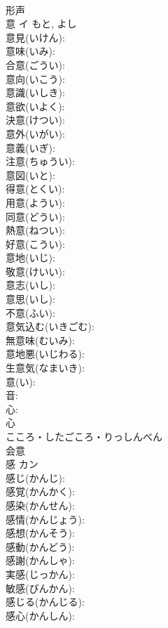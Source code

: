 \documentclass[8pt]{extreport}
\begin{document}
\begin{CJK}{UTF8}{min}
\\	形声 
\\	意	イ		もと, よし	
\\	意見(いけん): 
\\	意味(いみ): 
\\	合意(ごうい): 
\\	意向(いこう): 
\\	意識(いしき): 
\\	意欲(いよく): 
\\	決意(けつい): 
\\	意外(いがい): 
\\	意義(いぎ): 
\\	注意(ちゅうい): 
\\	意図(いと): 
\\	得意(とくい): 
\\	用意(ようい): 
\\	同意(どうい): 
\\	熱意(ねつい): 
\\	好意(こうい): 
\\	意地(いじ): 
\\	敬意(けいい): 
\\	意志(いし): 
\\	意思(いし): 
\\	不意(ふい): 
\\	意気込む(いきごむ): 
\\	無意味(むいみ): 
\\	意地悪(いじわる): 
\\	生意気(なまいき): 
\\	意(い): 
\\	音: 
\\	心: 
\\	心	
\\	こころ・したごころ・りっしんべん	
\\	会意 
\\	感	カン			
\\	感じ(かんじ): 
\\	感覚(かんかく): 
\\	感染(かんせん): 
\\	感情(かんじょう): 
\\	感想(かんそう): 
\\	感動(かんどう): 
\\	感謝(かんしゃ): 
\\	実感(じっかん): 
\\	敏感(びんかん): 
\\	感じる(かんじる): 
\\	感心(かんしん): 

\end{CJK}
\end{document}

